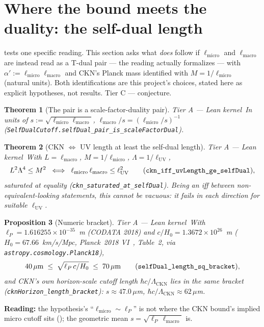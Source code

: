 \documentclass[11pt,a4paper]{article}
\newtheorem{theorem}{Theorem}[section]
\newtheorem{proposition}[theorem]{Proposition}
\theoremstyle{remark}
\newcommand{\tierA}{\colorbox{green!15}{\textsf{\scriptsize Tier A --- Lean kernel}}}
\newcommand{\tierC}{\colorbox{orange!15}{\textsf{\scriptsize Tier C --- conjecture}}}
\begin{document}
\section{Where the bound meets the duality: the self-dual length}
\label{sec:selfdual}
 tests one specific reading. This section asks what \emph{does} follow if
$\ell_{\mathrm{micro}}$ and $\ell_{\mathrm{macro}}$ are instead read as a T-dual pair --- the
reading  actually formalizes --- with $\alpha':=\ell_{\mathrm{micro}}\ell_{\mathrm{macro}}$
and CKN's Planck mass identified with $M=1/\ell_{\mathrm{micro}}$ (natural units). Both
identifications are this project's choices, stated here as explicit hypotheses, not results.
\tierC.

\begin{theorem}[The pair is a scale-factor-duality pair] \label{thm:pairisdual} \tierA\
In units of $s:=\sqrt{\ell_{\mathrm{micro}}\ell_{\mathrm{macro}}}$,
$\ell_{\mathrm{macro}}/s=(\ell_{\mathrm{micro}}/s)^{-1}$
\textnormal{(}\texttt{SelfDualCutoff.selfDual\_pair\_is\_scaleFactorDual}\textnormal{)}.
\end{theorem}

\begin{theorem}[CKN $\iff$ UV length at least the self-dual length] \label{thm:ckniff} \tierA\
With $L=\ell_{\mathrm{macro}}$, $M=1/\ell_{\mathrm{micro}}$, $\Lambda=1/\ell_{\mathrm{UV}}$,
\[
L^2\Lambda^4\le M^2 \;\iff\; \ell_{\mathrm{micro}}\,\ell_{\mathrm{macro}}\le\ell_{\mathrm{UV}}^2
\qquad\textnormal{(\texttt{ckn\_iff\_uvLength\_ge\_selfDual})},
\]
saturated at equality \textnormal{(}\texttt{ckn\_saturated\_at\_selfDual}\textnormal{)}. Being an
\textsf{iff} between non-equivalent-looking statements, this cannot be vacuous: it fails in each
direction for suitable $\ell_{\mathrm{UV}}$.
\end{theorem}

\begin{proposition}[Numeric bracket] \label{prop:bracket} \tierA\
With $\ell_P=1.616255\times10^{-35}$~m (CODATA 2018) and $c/H_0=1.3672\times10^{26}$~m
($H_0=67.66$~km/s/Mpc, Planck~2018 VI~\cite{Planck2018VI}, Table~2, via
\texttt{astropy.cosmology.Planck18}),
\[
40\,\mu\mathrm{m}\;\le\;\sqrt{\ell_P\,c/H_0}\;\le\;70\,\mu\mathrm{m}
\qquad\textnormal{(\texttt{selfDual\_length\_sq\_bracket})},
\]
and CKN's own horizon-scale cutoff length $\hbar c/\Lambda_{\mathrm{CKN}}$ lies in the same
bracket \textnormal{(}\texttt{cknHorizon\_length\_bracket}\textnormal{)}: $s\approx47.0\,\mu$m,
$\hbar c/\Lambda_{\mathrm{CKN}}\approx62\,\mu$m.
\end{proposition}
\textbf{Reading:} the hypothesis's ``$\ell_{\mathrm{micro}}\sim\ell_P$'' is not where the CKN
bound's implied micro cutoff sits (); the geometric mean
$s=\sqrt{\ell_P\,\ell_{\mathrm{macro}}}$ is.
\end{document}
